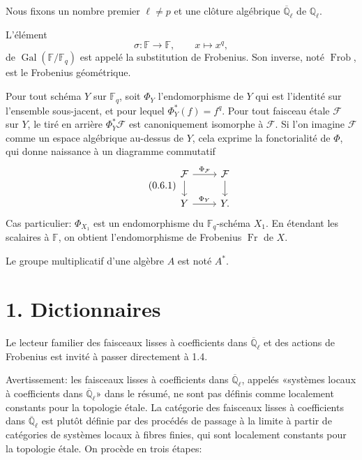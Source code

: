 \documentclass[10pt]{article}
\newcommand{\Fq}{\mathbb F_q}
\newcommand{\Fb}{\mathbb F}
\newcommand{\Ql}{\overline{\mathbb Q}_{\ell}}
\newcommand{\Gal}{\operatorname{Gal}}
\newcommand{\Fr}{\operatorname{Fr}}
\newcommand{\Frob}{\operatorname{Frob}}
\theoremstyle{deligne}
\newcommand{\heading}[1]{\vspace{0.7em}\noindent{\bfseries #1}\quad}
\begin{document}
\heading{0.4.} Nous fixons un nombre premier $\ell\ne p$ et une clôture algébrique $\Ql$ de $\mathbb Q_\ell$.

\heading{0.5.} L'élément
\[
 \sigma:\Fb\longrightarrow\Fb,
 \qquad x\longmapsto x^q,
\]
de $\Gal(\Fb/\Fq)$ est appelé la substitution de Frobenius. Son inverse, noté $\Frob$, est le Frobenius géométrique.

\heading{0.6.} Pour tout schéma $Y$ sur $\Fq$, soit $\Phi_Y$ l'endomorphisme de $Y$ qui est l'identité sur l'ensemble sous-jacent, et pour lequel $\Phi_Y^*(f)=f^q$. Pour tout faisceau \'{e}tale $\mathcal F$ sur $Y$, le tiré en arrière $\Phi_Y^*\mathcal F$ est canoniquement isomorphe à $\mathcal F$. Si l'on imagine $\mathcal F$ comme un espace algébrique au-dessus de $Y$, cela exprime la fonctorialité de $\Phi$, qui donne naissance à un diagramme commutatif
\begin{equation}\tag{0.6.1}
\begin{tikzcd}[column sep=2.4em,row sep=1.6em]
\mathcal F \arrow[r,"\Phi_{\mathcal F}"] \arrow[d] & \mathcal F \arrow[d]\\
Y \arrow[r,"\Phi_Y"] & Y .
\end{tikzcd}
\end{equation}
Cas particulier: $\Phi_{X_1}$ est un endomorphisme du $\Fq$-schéma $X_1$. En étendant les scalaires à $\Fb$, on obtient l'endomorphisme de Frobenius $\Fr$ de $X$.

\heading{0.7.} Le groupe multiplicatif d'une algèbre $A$ est noté $A^*$.

\section*{1. Dictionnaires}

Le lecteur familier des faisceaux lisses à coefficients dans $\Ql$ et des actions de Frobenius est invité à passer directement à 1.4.

\heading{1.1.} Avertissement: les faisceaux lisses à coefficients dans $\Ql$, appelés «systèmes locaux à coefficients dans $\Ql$» dans le résumé, ne sont pas définis comme localement constants pour la topologie \'{e}tale. La catégorie des faisceaux lisses à coefficients dans $\Ql$ est plutôt définie par des procédés de passage à la limite à partir de catégories de systèmes locaux à fibres finies, qui sont localement constants pour la topologie \'{e}tale. On procède en trois étapes:
\end{document}
